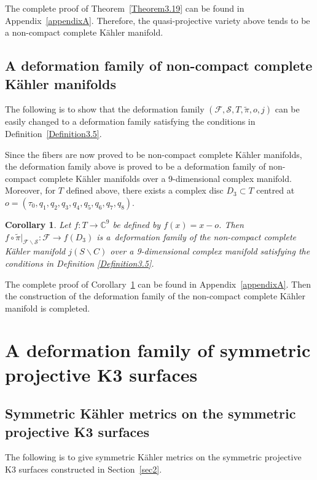 \documentclass[pdftex]{sigma}
\numberwithin{equation}{section}
\newtheorem{Corollary}[Theorem]{Corollary}
\begin{document}
The complete proof of Theorem~\ref{Theorem3.19} can be found in Appendix~\ref{appendixA}. Therefore, the quasi-projective variety above tends to be a non-compact complete K\"ahler manifold.

\subsection{A deformation family of non-compact complete K\"ahler manifolds}

The following is to show that the deformation family $(\mathcal{F},\mathcal{S},T,\widetilde{\pi},o,j)$ can be easily changed to a deformation family satisfying the conditions in Definition~\ref{Definition3.5}.

Since the fibers are now proved to be non-compact complete K\"ahler manifolds, the deformation family above is proved to be a deformation family of non-compact complete K\"ahler manifolds over a 9-dimensional complex manifold.
Moreover, for $T$ defined above, there exists a complex disc $D_3 \subset T$ centred at $o=(\tau_0,q_1,q_2,q_3,q_4,q_5,q_6,q_7,q_8)$.

\begin{Corollary} \label{Corollary3.20}
Let $f\colon T \rightarrow \mathbb{C}^9$ be defined by $f(x)=x-o$. Then $f \circ \widetilde{\pi}|_{\mathcal{F}\backslash \mathcal{S}}\colon\mathcal{F} \rightarrow f(D_3)$ is a~deformation family of the non-compact complete K\"ahler manifold $j(S\backslash C)$ over a 9-dimensional complex manifold satisfying the conditions in Definition {\rm\ref{Definition3.5}}.
\end{Corollary}

The complete proof of Corollary~\ref{Corollary3.20} can be found in Appendix~\ref{appendixA}. Then the construction of the deformation family of the non-compact complete K\"ahler manifold is completed.

\section{A deformation family of symmetric projective K3 surfaces}\label{sec4}

\subsection{Symmetric K\"ahler metrics on the symmetric projective K3 surfaces}

The following is to give symmetric K\"ahler metrics on the symmetric projective K3 surfaces constructed in Section~\ref{sec2}.
\end{document}
